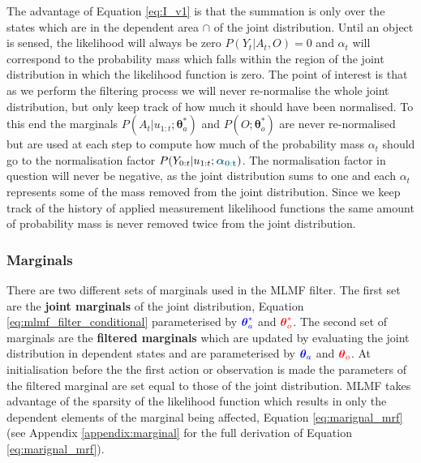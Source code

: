 \documentclass{frontiersSCNS} %
\newcommand*{\mathcolor}{}
\def\mathcolor#1#{\mathcoloraux{#1}}
\newcommand*{\mathcoloraux}[3]{%
  \protect\leavevmode
  \begingroup
    \color#1{#2}#3%
  \endgroup
}
\newcommand{\ThAs}{\boldsymbol{\theta}^*_a}
\newcommand{\ThOs}{\boldsymbol{\theta}^*_o}
\newcommand{\ThA}{\boldsymbol{\theta}_a}
\newcommand{\ThO}{\boldsymbol{\theta}_o}
\newcommand{\BAlph}{\boldsymbol{\alpha}_{\mathbf{0:t}}}
\begin{document}
The advantage of Equation \ref{eq:I_v1} is that the summation is only over the states which are in the dependent area $\cap$ of the joint 
distribution. Until an object is sensed, the likelihood will always be zero $P(Y_t|A_t,O) = 0$ and $\alpha_t$ will correspond to the probability 
mass which falls within the region of the joint distribution in which the likelihood function is zero. 
The point of interest is that as we perform the filtering process we will never re-normalise the whole joint distribution, but only keep 
track of how much it should have been normalised. To this end the marginals $P(A_t|u_{1:t};\ThAs)$ and $P(O;\ThOs)$  are never re-normalised but are used
at each step to compute how much of the probability mass $\alpha_t$ should go to the normalisation factor $P(Y_{0:t}|u_{1:t};\mathcolor{dark-blue}{\BAlph})$. 
The normalisation factor in question will never be negative, as the joint distribution sums to one and each $\alpha_t$ represents some of the mass removed from the joint distribution. Since we 
keep track of the history of applied  measurement likelihood functions the same amount of probability mass is never removed twice
from the joint distribution.

\subsubsection{Marginals}

There are two different sets of marginals used in the MLMF filter. The first set are the \textbf{joint marginals} of the joint distribution, Equation \ref{eq:mlmf_filter_conditional}
parameterised by $\mathcolor{blue}{\ThAs}$ and $\mathcolor{red}{\ThOs}$. The second set of marginals are the \textbf{filtered marginals} which are updated by evaluating the joint distribution in dependent states and 
are parameterised by $\mathcolor{blue}{\ThA}$ and $\mathcolor{red}{\ThO}$. At initialisation before the the first action or observation is made 
the parameters of the filtered marginal are set equal to those of the joint distribution. MLMF takes advantage of the sparsity of the likelihood function which results in only the dependent elements of the marginal being affected, 
Equation \ref{eq:marignal_mrf} (see Appendix \ref{appendix:marginal} for the full derivation of Equation \ref{eq:marignal_mrf}). 
\end{document}
